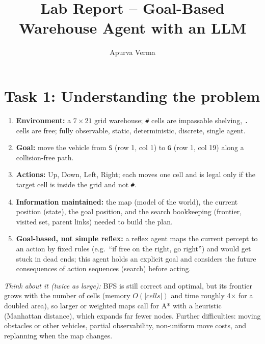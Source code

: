 \documentclass[10pt,a4paper]{article}
\title{Lab Report -- Goal-Based Warehouse Agent with an LLM}
\author{Apurva Verma}\date{}
\begin{document}
\maketitle

\section*{Task 1: Understanding the problem}
\begin{enumerate}[leftmargin=*]
\item \textbf{Environment:} a $7\times21$ grid warehouse; \texttt{\#} cells are impassable shelving, \texttt{.} cells are free; fully observable, static, deterministic, discrete, single agent.
\item \textbf{Goal:} move the vehicle from \texttt{S} (row 1, col 1) to \texttt{G} (row 1, col 19) along a collision-free path.
\item \textbf{Actions:} Up, Down, Left, Right; each moves one cell and is legal only if the target cell is inside the grid and not \texttt{\#}.
\item \textbf{Information maintained:} the map (model of the world), the current position (state), the goal position, and the search bookkeeping (frontier, visited set, parent links) needed to build the plan.
\item \textbf{Goal-based, not simple reflex:} a reflex agent maps the current percept to an action by fixed rules (e.g.\ ``if free on the right, go right'') and would get stuck in dead ends; this agent holds an explicit goal and considers the future consequences of action sequences (search) before acting.
\end{enumerate}
\textit{Think about it (twice as large):} BFS is still correct and optimal, but its frontier grows with the number of cells (memory $O(|cells|)$ and time roughly 4$\times$ for a doubled area), so larger or weighted maps call for A* with a heuristic (Manhattan distance), which expands far fewer nodes. Further difficulties: moving obstacles or other vehicles, partial observability, non-uniform move costs, and replanning when the map changes.
\end{document}

